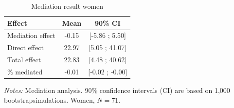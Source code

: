 \begin{table}[htbp]
\centering
\caption{Mediation result women}
\label{tab:mediation_probability_women}
\begin{threeparttable}
\begin{tabular}{@{}lcc@{}}
\toprule
Effect & Mean & 90\% CI \\
\midrule
Mediation effect & -0.15 & [-5.86 ; 5.50] \\
Direct effect & 22.97 & [5.05 ; 41.07] \\
Total effect & 22.83 & [4.48 ; 40.62] \\
\% mediated & -0.01 & [-0.02 ; -0.00] \\
\bottomrule
\end{tabular}
\begin{tablenotes}[flushleft]
\footnotesize
\item[] \textit{Notes:} Mediation analysis. 90\% confidence intervals (CI) are based on 1,000 bootstrapsimulations. Women, \(N=71\).
\end{tablenotes}
\end{threeparttable}
\end{table}
